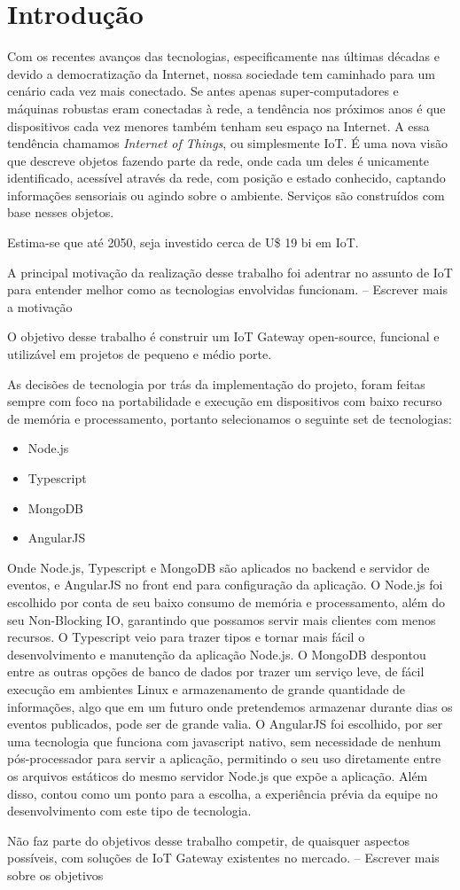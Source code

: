 \section*{Introdução}
\label{sec:intro}

Com os recentes avanços das tecnologias, especificamente nas últimas décadas e devido a democratização da Internet, nossa sociedade tem caminhado para um cenário cada vez mais conectado. Se antes apenas super-computadores e máquinas robustas eram conectadas à rede, a tendência nos próximos anos é que dispositivos cada vez menores também tenham seu espaço na Internet.
A essa tendência chamamos \textit{Internet of Things}, ou simplesmente IoT. É uma nova visão que descreve objetos fazendo parte da rede, onde cada um deles é unicamente identificado, acessível através da rede, com posição e estado conhecido, captando informações sensoriais ou agindo sobre o ambiente. Serviços são construídos com base nesses objetos.

Estima-se que até 2050, seja investido cerca de U\$ 19 bi em IoT.

A principal motivação da realização desse trabalho foi adentrar no assunto de IoT para entender melhor como as tecnologias envolvidas funcionam.
-- Escrever mais a motivação

O objetivo desse trabalho é construir um IoT Gateway open-source, funcional e utilizável em projetos de pequeno e médio porte.

As decisões de tecnologia por trás da implementação do projeto, foram feitas sempre com foco na portabilidade e execução em dispositivos com baixo recurso de memória e processamento, portanto selecionamos o seguinte set de tecnologias:
\begin{itemize}
\item Node.js
\item Typescript
\item MongoDB
\item AngularJS
\end{itemize}
Onde Node.js, Typescript e MongoDB são aplicados no backend e servidor de eventos, e AngularJS no front end para configuração da aplicação.
O Node.js foi escolhido por conta de seu baixo consumo de memória e processamento, além do seu Non-Blocking IO, garantindo que possamos servir mais clientes com menos recursos. O Typescript veio para trazer tipos e tornar mais fácil o desenvolvimento e manutenção da aplicação Node.js.
O MongoDB despontou entre as outras opções de banco de dados por trazer um serviço leve, de fácil execução em ambientes Linux e armazenamento de grande quantidade de informações, algo que em um futuro onde pretendemos armazenar durante dias os eventos publicados, pode ser de grande valia.
O AngularJS foi escolhido, por ser uma tecnologia que funciona com javascript nativo, sem necessidade de nenhum pós-processador para servir a aplicação, permitindo o seu uso diretamente entre os arquivos estáticos do mesmo servidor Node.js que expõe a aplicação. Além disso, contou como um ponto para a escolha, a experiência prévia da equipe no desenvolvimento com este tipo de tecnologia.

Não faz parte do objetivos desse trabalho competir, de quaisquer aspectos possíveis, com soluções de IoT Gateway existentes no mercado.
-- Escrever mais sobre os objetivos

